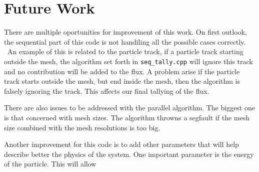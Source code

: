 \section{Future Work}
There are multiple oportunities for improvement of this work. On first outlook, 
the sequential part of this code is not handiling all the possible cases correctly. \
An example of this is related to the particle track, if a particle track starting 
outside the mesh, the algorithm set forth in \texttt{seq\_tally.cpp} will ignore this 
track and no contribution will be added to the flux. 
A problem arise if the particle track starts outside the mesh, but end inside the mesh, 
then the algorithm is falsely ignoring the track. This affects our final tallying of the 
flux. 


There are also issues to be addressed with the parallel algorithm. The biggest one is that 
concerned with mesh sizes. The algorithm throwns a segfault if the mesh size combined 
with the mesh resolutions is too big. 

Another improvement for this code is to add other parameters that will help 
describe better the physics of the system. One important parameter is the 
energy of the particle. This will allow 
